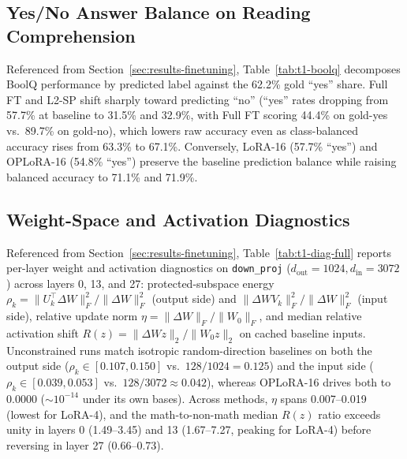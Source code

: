 \documentclass{article}
\begin{document}
\subsection{Yes/No Answer Balance on Reading Comprehension}
\label{app:ft-boolq}
Referenced from Section~\ref{sec:results-finetuning}, Table~\ref{tab:t1-boolq} decomposes BoolQ performance by predicted label against the 62.2\% gold ``yes'' share. Full FT and L2-SP shift sharply toward predicting ``no'' (``yes'' rates dropping from 57.7\% at baseline to 31.5\% and 32.9\%, with Full FT scoring 44.4\% on gold-yes vs.\ 89.7\% on gold-no), which lowers raw accuracy even as class-balanced accuracy rises from 63.3\% to 67.1\%. Conversely, LoRA-16 (57.7\% ``yes'') and OPLoRA-16 (54.8\% ``yes'') preserve the baseline prediction balance while raising balanced accuracy to 71.1\% and 71.9\%.


\subsection{Weight-Space and Activation Diagnostics}
\label{app:ft-diagnostics}
Referenced from Section~\ref{sec:results-finetuning}, Table~\ref{tab:t1-diag-full} reports per-layer weight and activation diagnostics on \texttt{down\_proj} ($d_{\text{out}}=1024, d_{\text{in}}=3072$) across layers 0, 13, and 27: protected-subspace energy $\rho_k = \|U_k^\top \Delta W\|_F^2 / \|\Delta W\|_F^2$ (output side) and $\|\Delta W V_k\|_F^2 / \|\Delta W\|_F^2$ (input side), relative update norm $\eta = \|\Delta W\|_F / \|W_0\|_F$, and median relative activation shift $R(z) = \|\Delta W z\|_2 / \|W_0 z\|_2$ on cached baseline inputs. Unconstrained runs match isotropic random-direction baselines on both the output side ($\rho_k \in [0.107, 0.150]$ vs.\ $128/1024 = 0.125$) and the input side ($\rho_k \in [0.039, 0.053]$ vs.\ $128/3072 \approx 0.042$), whereas OPLoRA-16 drives both to 0.0000 ($\sim 10^{-14}$ under its own bases). Across methods, $\eta$ spans 0.007--0.019 (lowest for LoRA-4), and the math-to-non-math median $R(z)$ ratio exceeds unity in layers 0 (1.49--3.45) and 13 (1.67--7.27, peaking for LoRA-4) before reversing in layer 27 (0.66--0.73).

\end{document}
